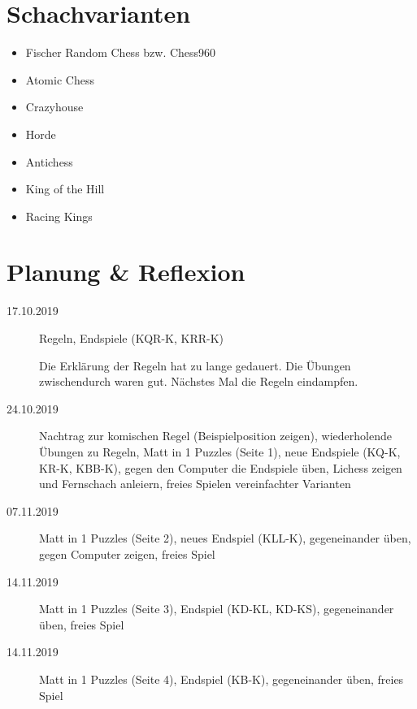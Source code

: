 \documentclass[
  a4paper,
  justified,
  nobib,
]{tufte-handout}
\begin{document}
\pagebreak

\section{Schachvarianten}%
\label{sec:schachvarianten}

\begin{itemize}
  \item Fischer Random Chess bzw. Chess960
  \item Atomic Chess
  \item Crazyhouse
  \item Horde
  \item Antichess
  \item King of the Hill
  \item Racing Kings
\end{itemize}

\section{Planung \& Reflexion}%
\label{sec:planung_reflexion}

\begin{description}
  \item[17.10.2019] Regeln, Endspiele (KQR-K, KRR-K)

    Die Erklärung der Regeln hat zu lange gedauert.
    Die Übungen zwischendurch waren gut.
    Nächstes Mal die Regeln eindampfen.

  \item[24.10.2019] Nachtrag zur komischen Regel (Beispielposition zeigen),
    wiederholende Übungen zu Regeln,
    Matt in 1 Puzzles (Seite 1),
    neue Endspiele (KQ-K, KR-K, KBB-K),
    gegen den Computer die Endspiele üben,
    Lichess zeigen und Fernschach anleiern,
    freies Spielen vereinfachter Varianten

  \item[07.11.2019] Matt in 1 Puzzles (Seite 2),
    neues Endspiel (KLL-K),
    gegeneinander üben,
    gegen Computer zeigen,
    freies Spiel

  \item[14.11.2019] Matt in 1 Puzzles (Seite 3),
    Endspiel (KD-KL, KD-KS),
    gegeneinander üben,
    freies Spiel

  \item[14.11.2019] Matt in 1 Puzzles (Seite 4),
    Endspiel (KB-K),
    gegeneinander üben,
    freies Spiel
\end{description}
\end{document}
